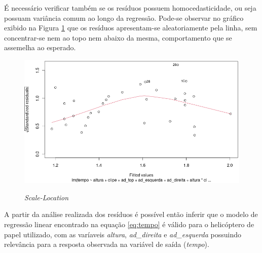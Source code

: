 É necessário verificar também se os resíduos possuem homocedasticidade, ou seja possuam variância comum ao longo da regressão. Pode-se observar no gráfico exibido na Figura \ref{fig:scale} que os resíduos apresentam-se aleatoriamente pela linha, sem concentrar-se nem ao topo nem abaixo da mesma, comportamento que se assemelha ao esperado.

\begin{figure}[H]
  \caption{\textit{Scale-Location}}
  \center 
  \includegraphics[scale=0.48]{images/scale_location.png}
  \label{fig:scale}
\end{figure}

A partir da análise realizada dos resíduos é possível então inferir que o modelo de regressão linear encontrado na equação \ref{eq:tempo} é válido para o helicóptero de papel utilizado, com as varíaveis \textit{altura}, \textit{ad\_direita} e \textit{ad\_esquerda} possuindo relevância para a resposta observada na variável de saída (\textit{tempo}).